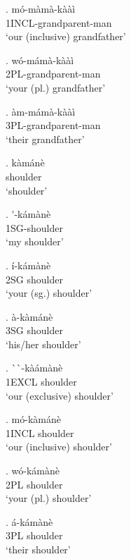 \documentclass{assets/fieldnotes}
\begin{document}
\exg. m\'{o}-m\`{a}m\`{a}-k\`{a}\`{a}\`{i} \\
1INCL-grandparent-man \\
`our (inclusive) grandfather' 


\exg. w\'{o}-m\'{a}m\`{a}-k\`{a}\`{a}\`{i} \\
2PL-grandparent-man \\
`your (pl.) grandfather'

\exg. \`{a}m-m\'{a}m\`{a}-k\`{a}\`{a}\`{i}\\
3PL-grandparent-man \\
`their grandfather'



\exg. k\`{a}m\'{a}n\`{e} \\
shoulder\\
`shoulder'

\exg. \'{}-k\'{a}m\`{a}n\`{e} \\
1SG-shoulder \\
`my shoulder'

\exg. \'{i}-k\'{a}m\`{a}n\`{e} \\
2SG shoulder \\
`your (sg.) shoulder'

\exg. \`{a}-k\`{a}m\'{a}n\`{e} \\
3SG shoulder \\
`his/her shoulder'

\exg. \`{}\`{}-k\`{a}\'{a}m\`{a}n\`{e} \\
1EXCL shoulder \\
`our (exclusive) shoulder'

\exg. m\'{o}-k\`{a}m\'{a}n\`{e} \\
1INCL shoulder \\
`our (inclusive) shoulder'

\exg. w\'{o}-k\'{a}m\`{a}n\`{e} \\
2PL shoulder \\
`your (pl.) shoulder'

\exg. \'{a}-k\'{a}m\`{a}n\`{e} \\
3PL shoulder \\
`their shoulder'


\end{document}
